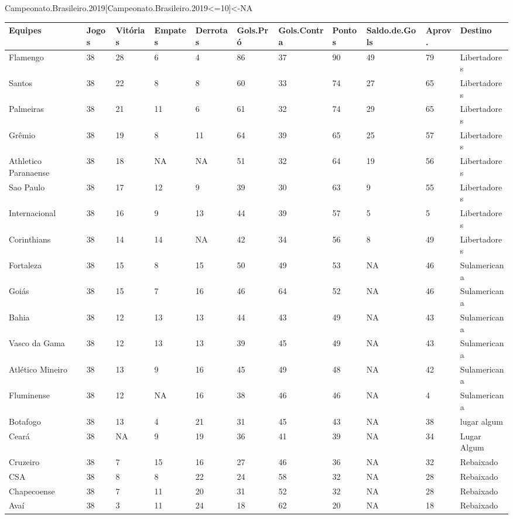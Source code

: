 \documentclass[
]{book}
\newenvironment{Shaded}{\begin{snugshade}}{\end{snugshade}}
\newcommand{\ConstantTok}[1]{\textcolor[rgb]{0.00,0.00,0.00}{#1}}
\newcommand{\DecValTok}[1]{\textcolor[rgb]{0.00,0.00,0.81}{#1}}
\newcommand{\FloatTok}[1]{\textcolor[rgb]{0.00,0.00,0.81}{#1}}
\newcommand{\NormalTok}[1]{#1}
\newcommand{\OtherTok}[1]{\textcolor[rgb]{0.56,0.35,0.01}{#1}}
\newcommand{\SpecialCharTok}[1]{\textcolor[rgb]{0.00,0.00,0.00}{#1}}
\begin{document}
\begin{Shaded}
\begin{Highlighting}[]
\NormalTok{Campeonato.Brasileiro}\FloatTok{.2019}\NormalTok{[Campeonato.Brasileiro}\FloatTok{.2019}\SpecialCharTok{\textless{}=}\DecValTok{10}\NormalTok{]}\OtherTok{\textless{}{-}}\ConstantTok{NA}
\end{Highlighting}
\end{Shaded}

\begin{tabular}{l|l|l|l|l|l|l|l|l|l|l}
\hline
Equipes & Jogos & Vitórias & Empates & Derrotas & Gols.Pró & Gols.Contra & Pontos & Saldo.de.Gols & Aprov. & Destino\\
\hline
Flamengo & 38 & 28 & 6 & 4 & 86 & 37 & 90 & 49 & 79 & Libertadores\\
\hline
Santos & 38 & 22 & 8 & 8 & 60 & 33 & 74 & 27 & 65 & Libertadores\\
\hline
Palmeiras & 38 & 21 & 11 & 6 & 61 & 32 & 74 & 29 & 65 & Libertadores\\
\hline
Grêmio & 38 & 19 & 8 & 11 & 64 & 39 & 65 & 25 & 57 & Libertadores\\
\hline
Athletico Paranaense & 38 & 18 & NA & NA & 51 & 32 & 64 & 19 & 56 & Libertadores\\
\hline
Sao Paulo & 38 & 17 & 12 & 9 & 39 & 30 & 63 & 9 & 55 & Libertadores\\
\hline
Internacional & 38 & 16 & 9 & 13 & 44 & 39 & 57 & 5 & 5 & Libertadores\\
\hline
Corinthians & 38 & 14 & 14 & NA & 42 & 34 & 56 & 8 & 49 & Libertadores\\
\hline
Fortaleza & 38 & 15 & 8 & 15 & 50 & 49 & 53 & NA & 46 & Sulamericana\\
\hline
Goiás & 38 & 15 & 7 & 16 & 46 & 64 & 52 & NA & 46 & Sulamericana\\
\hline
Bahia & 38 & 12 & 13 & 13 & 44 & 43 & 49 & NA & 43 & Sulamericana\\
\hline
Vasco da Gama & 38 & 12 & 13 & 13 & 39 & 45 & 49 & NA & 43 & Sulamericana\\
\hline
Atlético Mineiro & 38 & 13 & 9 & 16 & 45 & 49 & 48 & NA & 42 & Sulamericana\\
\hline
Fluminense & 38 & 12 & NA & 16 & 38 & 46 & 46 & NA & 4 & Sulamericana\\
\hline
Botafogo & 38 & 13 & 4 & 21 & 31 & 45 & 43 & NA & 38 & lugar algum\\
\hline
Ceará & 38 & NA & 9 & 19 & 36 & 41 & 39 & NA & 34 & Lugar Algum\\
\hline
Cruzeiro & 38 & 7 & 15 & 16 & 27 & 46 & 36 & NA & 32 & Rebaixado\\
\hline
CSA & 38 & 8 & 8 & 22 & 24 & 58 & 32 & NA & 28 & Rebaixado\\
\hline
Chapecoense & 38 & 7 & 11 & 20 & 31 & 52 & 32 & NA & 28 & Rebaixado\\
\hline
Avaí & 38 & 3 & 11 & 24 & 18 & 62 & 20 & NA & 18 & Rebaixado\\
\hline
\end{tabular}
\end{document}
